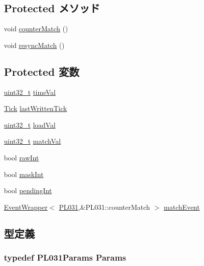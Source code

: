 \subsection*{Protected メソッド}
\begin{DoxyCompactItemize}
\item 
void \hyperlink{classPL031_a03ecb5b0aa40b2ad3821439cd5e01dcd}{counterMatch} ()
\item 
void \hyperlink{classPL031_a156827b3ed8457dd136c7fb2043e204c}{resyncMatch} ()
\end{DoxyCompactItemize}
\subsection*{Protected 変数}
\begin{DoxyCompactItemize}
\item 
\hyperlink{Type_8hh_a435d1572bf3f880d55459d9805097f62}{uint32\_\-t} \hyperlink{classPL031_a23ef4b16aed51d417165b72f38e59f33}{timeVal}
\item 
\hyperlink{base_2types_8hh_a5c8ed81b7d238c9083e1037ba6d61643}{Tick} \hyperlink{classPL031_a5ec5436086013ab89afd5d80ce94d811}{lastWrittenTick}
\item 
\hyperlink{Type_8hh_a435d1572bf3f880d55459d9805097f62}{uint32\_\-t} \hyperlink{classPL031_a649a97ed02659f08e9b7064c15839dc8}{loadVal}
\item 
\hyperlink{Type_8hh_a435d1572bf3f880d55459d9805097f62}{uint32\_\-t} \hyperlink{classPL031_afa49f4e3c316a9e0343eecbcbd92d4dd}{matchVal}
\item 
bool \hyperlink{classPL031_a5f9476d82d9f414dccd9b49558d459bc}{rawInt}
\item 
bool \hyperlink{classPL031_a9212a63025fe8820d56a0bd3943c158c}{maskInt}
\item 
bool \hyperlink{classPL031_af3f4acf42e0f2210078e61204edbab91}{pendingInt}
\item 
\hyperlink{classEventWrapper}{EventWrapper}$<$ \hyperlink{classPL031}{PL031},\&PL031::counterMatch $>$ \hyperlink{classPL031_ac07c37f262f3f70510cc5c198f823d09}{matchEvent}
\end{DoxyCompactItemize}


\subsection{型定義}
\hypertarget{classPL031_acd44fa02a8cc03d321b406d70faea0d8}{
\subsubsection[{Params}]{\setlength{\rightskip}{0pt plus 5cm}typedef PL031Params {\bf Params}}}
\label{classPL031_acd44fa02a8cc03d321b406d70faea0d8}


